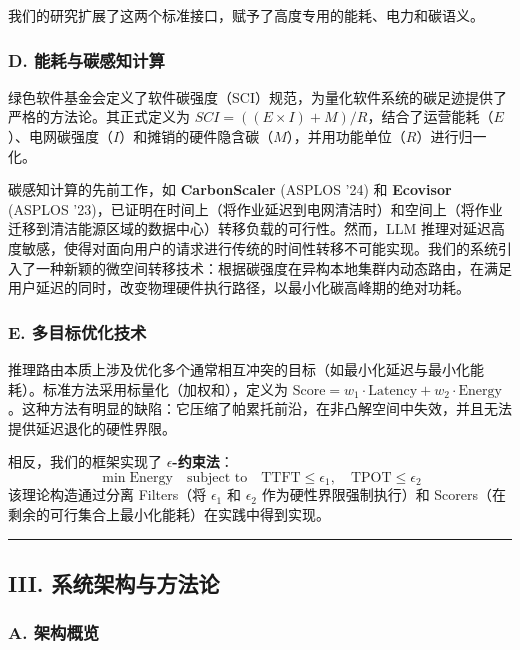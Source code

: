 我们的研究扩展了这两个标准接口，赋予了高度专用的能耗、电力和碳语义。

\subsubsection{D. 能耗与碳感知计算}\label{d.-energy-and-carbon-aware-computing}

绿色软件基金会定义了软件碳强度（SCI）规范，为量化软件系统的碳足迹提供了严格的方法论。其正式定义为 \(SCI = ((E \times I) + M) / R\)，结合了运营能耗（\(E\)）、电网碳强度（\(I\)）和摊销的硬件隐含碳（\(M\)），并用功能单位（\(R\)）进行归一化。

碳感知计算的先前工作，如 \textbf{CarbonScaler} (ASPLOS '24) 和 \textbf{Ecovisor} (ASPLOS '23)，已证明在时间上（将作业延迟到电网清洁时）和空间上（将作业迁移到清洁能源区域的数据中心）转移负载的可行性。然而，LLM 推理对延迟高度敏感，使得对面向用户的请求进行传统的时间性转移不可能实现。我们的系统引入了一种新颖的微空间转移技术：根据碳强度在异构本地集群内动态路由，在满足用户延迟的同时，改变物理硬件执行路径，以最小化碳高峰期的绝对功耗。

\subsubsection{E. 多目标优化技术}\label{e.-multi-objective-optimization-techniques}

推理路由本质上涉及优化多个通常相互冲突的目标（如最小化延迟与最小化能耗）。标准方法采用标量化（加权和），定义为 \(\text{Score} = w_1 \cdot \text{Latency} + w_2 \cdot \text{Energy}\)。这种方法有明显的缺陷：它压缩了帕累托前沿，在非凸解空间中失效，并且无法提供延迟退化的硬性界限。

相反，我们的框架实现了 \textbf{\texorpdfstring{\(\epsilon\)}{ε}-约束法}：
\[ \min \text{Energy} \quad \text{subject to} \quad \text{TTFT} \leq \epsilon_1, \quad \text{TPOT} \leq \epsilon_2 \]
该理论构造通过分离 Filters（将 \(\epsilon_1\) 和 \(\epsilon_2\) 作为硬性界限强制执行）和 Scorers（在剩余的可行集合上最小化能耗）在实践中得到实现。

\begin{center}\rule{0.5\linewidth}{0.5pt}\end{center}

\subsection{III. 系统架构与方法论}\label{iii.-system-architecture-and-methodology}

\subsubsection{A. 架构概览}\label{a.-architectural-overview}

